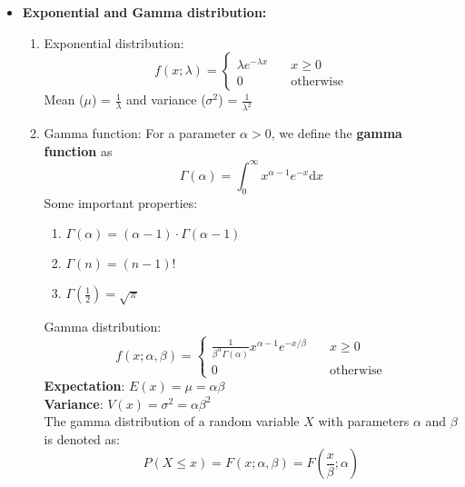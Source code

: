 \documentclass[a4paper]{article}
\begin{document}
\begin{itemize}
    \item \textbf{Exponential and Gamma distribution:}
    \begin{enumerate}
        \item Exponential distribution:
        \begin{equation*}
            f(x;\lambda) = \begin{cases}
            \lambda e^{-\lambda x}\quad & x\geq 0\\
            0\quad & \text{otherwise}
            \end{cases}
        \end{equation*}
        Mean ($\mu$) = $\frac{1}{\lambda}$ and variance ($\sigma^2$) = $\frac{1}{\lambda^2}$
        \item Gamma function: For a parameter $\alpha > 0$, we define the \textbf{gamma function} as
        \begin{equation*}
            \Gamma(\alpha) = \int_{0}^{\infty}x^{\alpha-1}e^{-x}\mathrm{d}x
        \end{equation*}
        Some important properties:
        \begin{enumerate}
            \item $\Gamma(\alpha) = (\alpha-1)\cdot\Gamma(\alpha-1)$
            \item $\Gamma(n) = (n-1)!$
            \item $\Gamma(\frac{1}{2}) = \sqrt{\pi}$
        \end{enumerate}
        Gamma distribution:
        \begin{equation*}
            f(x; \alpha,\beta) = \begin{cases}
              \frac{1}{\beta^\alpha\Gamma(\alpha)}x^{\alpha-1}e^{-x/\beta}\quad & x\geq 0\\
              0 \quad &\text{otherwise}
            \end{cases}
        \end{equation*}
        \textbf{Expectation}: $E(x) = \mu = \alpha\beta$\\
        \textbf{Variance}: $V(x) = \sigma^2 = \alpha\beta^2$\\
        The gamma distribution of a random variable $X$ with parameters $\alpha$ and $\beta$ is denoted as:
        \begin{equation*}
            P(X\leq x) = F(x; \alpha,\beta) = F\left(\frac{x}{\beta}; \alpha\right)
        \end{equation*}
    

\end{enumerate}
\end{itemize}
\end{document}
